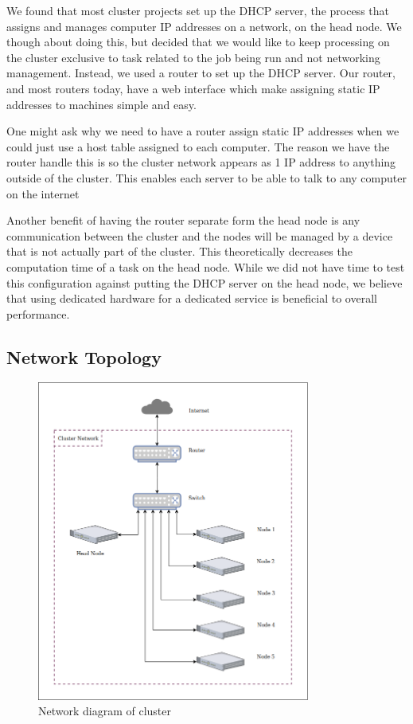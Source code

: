 \documentclass[12pt]{article}
\begin{document}
We found that most cluster projects set up the DHCP server, the process that assigns and manages computer IP addresses on a network, on the head node. We though about doing this, but decided that we would like to keep processing on the cluster exclusive to task related to the job being run and not networking management. Instead, we used a router to set up the DHCP server. Our router, and most routers today, have a web interface which make assigning static IP addresses to machines simple and easy.

One might ask why we need to have a router assign static IP addresses when we could just use a host table assigned to each computer. The reason we have the router handle this is so the cluster network appears as 1 IP address to anything outside of the cluster. This enables each server to be able to talk to any computer on the internet 

Another benefit of having the router separate form the head node is any communication between the cluster and the nodes will be managed by a device that is not actually part of the cluster. This theoretically decreases the computation time of a task on the head node. While we did not have time to test this configuration against putting the DHCP server on the head node, we believe that using dedicated hardware for a dedicated service is beneficial to overall performance.

\subsection{Network Topology}

\begin{figure} [!htb]
    \centering
    \includegraphics[width=0.8\textwidth, height=0.55\textheight]{NetworkDiagram.png}
    \caption{Network diagram of cluster}
    \label{fig:network}
\end{figure}
\end{document}
